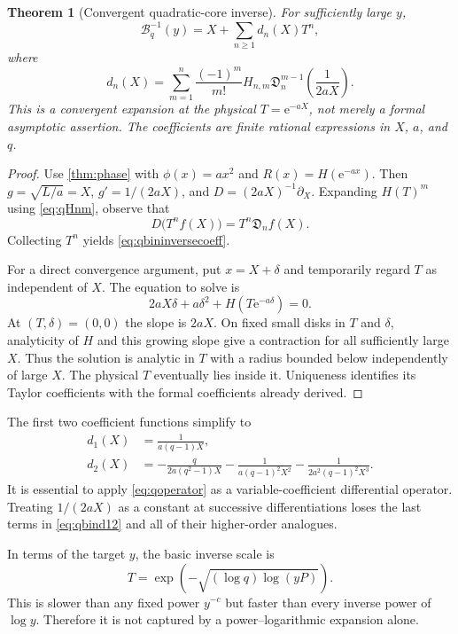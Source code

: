 \documentclass[11pt,a4paper]{article}
\newtheorem{theorem}{Theorem}[section]
\theoremstyle{definition}
\theoremstyle{remark}
\newcommand{\ee}{\mathrm e}
\numberwithin{equation}{section}
\begin{document}
\begin{theorem}[Convergent quadratic-core inverse]
\label{thm:qbininverse}
For sufficiently large $y$,
\begin{equation}
 \mathcal B_q^{-1}(y)=X+\sum_{n\ge1}d_n(X)T^n,
 \label{eq:qbininverse}
\end{equation}
where
\begin{equation}
 d_n(X)=\sum_{m=1}^n\frac{(-1)^m}{m!}H_{n,m}
 \mathfrak D_n^{m-1}\left(\frac1{2aX}\right).
 \label{eq:qbininversecoeff}
\end{equation}
This is a convergent expansion at the physical $T=\ee^{-aX}$, not merely a formal asymptotic assertion. The coefficients are finite rational expressions in $X$, $a$, and $q$.
\end{theorem}
\begin{proof}
Use \cref{thm:phase} with $\phi(x)=ax^2$ and $R(x)=H(\ee^{-ax})$. Then $g=\sqrt{L/a}=X$, $g'=1/(2aX)$, and $D=(2aX)^{-1}\partial_X$. Expanding $H(T)^m$ using \eqref{eq:qHnm}, observe that
\[
 D\bigl(T^n f(X)\bigr)=T^n\mathfrak D_n f(X).
\]
Collecting $T^n$ yields \eqref{eq:qbininversecoeff}.

For a direct convergence argument, put $x=X+\delta$ and temporarily regard $T$ as independent of $X$. The equation to solve is
\[
 2aX\delta+a\delta^2+H(T\ee^{-a\delta})=0.
\]
At $(T,\delta)=(0,0)$ the slope is $2aX$. On fixed small disks in $T$ and $\delta$, analyticity of $H$ and this growing slope give a contraction for all sufficiently large $X$. Thus the solution is analytic in $T$ with a radius bounded below independently of large $X$. The physical $T$ eventually lies inside it. Uniqueness identifies its Taylor coefficients with the formal coefficients already derived.
\end{proof}

The first two coefficient functions simplify to
\begin{align}
 d_1(X)&=\frac1{a(q-1)X},\nonumber\\
 d_2(X)&=-\frac{q}{2a(q^2-1)X}
 -\frac1{a(q-1)^2X^2}
 -\frac1{2a^2(q-1)^2X^3}.
 \label{eq:qbind12}
\end{align}
It is essential to apply \eqref{eq:qoperator} as a variable-coefficient differential operator. Treating $1/(2aX)$ as a constant at successive differentiations loses the last terms in \eqref{eq:qbind12} and all of their higher-order analogues.

In terms of the target $y$, the basic inverse scale is
\begin{equation}
 T=\exp\!\left(-\sqrt{(\log q)\log(yP)}\right).
 \label{eq:qbinscale}
\end{equation}
This is slower than any fixed power $y^{-c}$ but faster than every inverse power of $\log y$. Therefore it is not captured by a power--logarithmic expansion alone.
\end{document}
